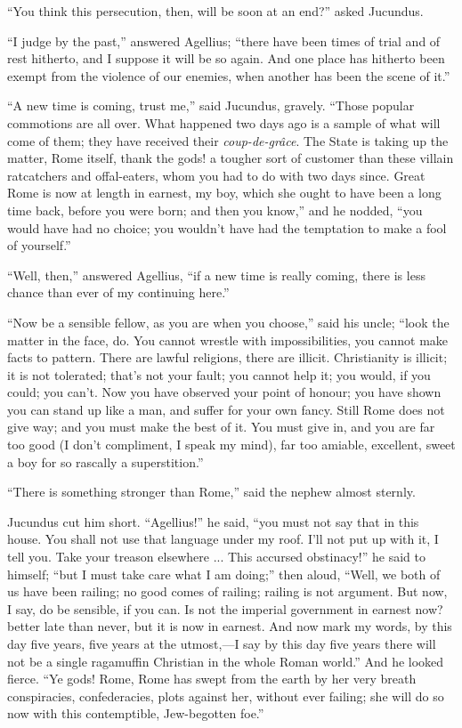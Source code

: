 ``You think this persecution, then, will be soon at an
end?'' asked Jucundus.

``I judge by the past,'' answered Agellius; ``there
have been times of trial and of rest hitherto, and I suppose it will
be so again. And one place has hitherto been exempt from the violence
of our enemies, when another has been the scene of it.''

``A new time is coming, trust me,'' said Jucundus, gravely.
``Those popular commotions are all over. What happened two days
ago is a sample of what will come of them; they have received their \emph{coup-de-grâce}.
The State is taking up the matter, Rome itself, thank the gods! a
tougher sort of customer than these villain ratcatchers and
offal-eaters, whom you had to do with two days since. Great Rome is
now at length in earnest, my boy, which she ought to have been a long
time back, before you were born; and then you know,'' and he
nodded, ``you would have had no choice; you wouldn't have had the
temptation to make a fool of yourself.''

``Well, then,'' answered Agellius, ``if a new time is
really coming, there is less chance than ever of my continuing
here.''

``Now be a sensible fellow, as you are when you choose,''
said his uncle; ``look the matter in the face, do. You cannot
wrestle with impossibilities, you cannot make facts to pattern. There
are lawful religions, there are illicit. Christianity is illicit; it
is not tolerated; that's not your fault; you cannot help it; you
would, if you could; you can't. Now you have observed your point of
honour; you have shown you can stand up like a man, and suffer for
your own fancy. Still Rome does not give way; and you must make the
best of it. You must give in, and you are far too good (I don't
compliment, I speak my mind), far too amiable, excellent, sweet a boy
for so rascally a superstition.''

``There is something stronger than Rome,'' said the nephew
almost sternly.

Jucundus cut him short. ``Agellius!'' he said, ``you
must not say that in this house. You shall not use that language under
my roof. I'll not put up with it, I tell you. Take your treason
elsewhere ... This accursed obstinacy!'' he said to himself;
``but I must take care what I am doing;'' then aloud,
``Well, we both of us have been railing; no good comes of railing;
railing is not argument. But now, I say, do be sensible, if you can.
Is not the imperial government in earnest now? better late than never,
but it is now in earnest. And now mark my words, by this day five
years, five years at the utmost,—I say by this day five years there
will not be a single ragamuffin Christian in the whole Roman
world.'' And he looked fierce. ``Ye gods! Rome, Rome has swept
from the earth by her very breath conspiracies, confederacies, plots
against her, without ever failing; she will do so now with this
contemptible, Jew-begotten foe.''

